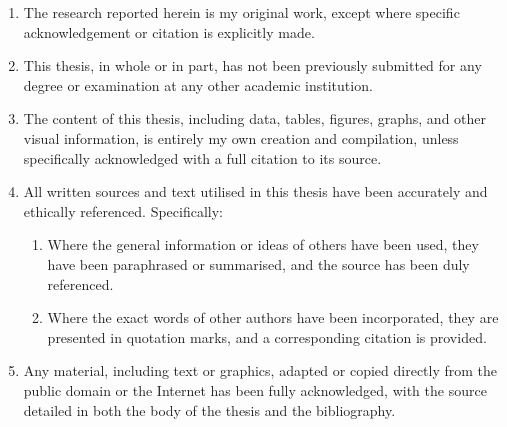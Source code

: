 \begin{enumerate}
\item The research reported herein is my original work, except where specific acknowledgement or citation is explicitly made.

\item This thesis, in whole or in part, has not been previously submitted for any degree or examination at any other academic institution.

\item The content of this thesis, including data, tables, figures, graphs, and other visual information, is entirely my own creation and compilation, unless specifically acknowledged with a full citation to its source.

\item All written sources and text utilised in this thesis have been accurately and ethically referenced. Specifically:
\begin{enumerate}
\item Where the general information or ideas of others have been used, they have been paraphrased or summarised, and the source has been duly referenced.
\item Where the exact words of other authors have been incorporated, they are presented in quotation marks, and a corresponding citation is provided.
\end{enumerate}
\item Any material, including text or graphics, adapted or copied directly from the public domain or the Internet has been fully acknowledged, with the source detailed in both the body of the thesis and the bibliography.
\end{enumerate}

\clearpage